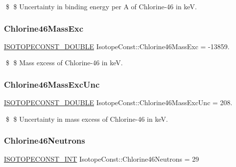 \$ \$ Uncertainty in binding energy per A of Chlorine-\/46 in keV. \mbox{\label{group___isotope_const-_chlorine-_cl46_ga582d06e1b5771e863b6f6a5ba1fd9a4d}} 
\subsubsection{\texorpdfstring{Chlorine46\+Mass\+Exc}{Chlorine46MassExc}}
{\footnotesize\ttfamily \mbox{\hyperlink{group___isotope_const-_macros_ga8f45a7272ce02c0b4c65c44636ed719a}{I\+S\+O\+T\+O\+P\+E\+C\+O\+N\+S\+T\+\_\+\+D\+O\+U\+B\+LE}} Isotope\+Const\+::\+Chlorine46\+Mass\+Exc = -\/13859.}

\$ \$ Mass excess of Chlorine-\/46 in keV. \mbox{\label{group___isotope_const-_chlorine-_cl46_ga2e4cd468a795758f44d8587af48742e3}} 
\subsubsection{\texorpdfstring{Chlorine46\+Mass\+Exc\+Unc}{Chlorine46MassExcUnc}}
{\footnotesize\ttfamily \mbox{\hyperlink{group___isotope_const-_macros_ga8f45a7272ce02c0b4c65c44636ed719a}{I\+S\+O\+T\+O\+P\+E\+C\+O\+N\+S\+T\+\_\+\+D\+O\+U\+B\+LE}} Isotope\+Const\+::\+Chlorine46\+Mass\+Exc\+Unc = 208.}

\$ \$ Uncertainty in mass excess of Chlorine-\/46 in keV. \mbox{\label{group___isotope_const-_chlorine-_cl46_gaa7d49d27b372c0ea72bb126d2d84e6a9}} 
\subsubsection{\texorpdfstring{Chlorine46\+Neutrons}{Chlorine46Neutrons}}
{\footnotesize\ttfamily \mbox{\hyperlink{group___isotope_const-_macros_ga5f18360b3e99483a35c32d789e62621c}{I\+S\+O\+T\+O\+P\+E\+C\+O\+N\+S\+T\+\_\+\+I\+NT}} Isotope\+Const\+::\+Chlorine46\+Neutrons = 29}

